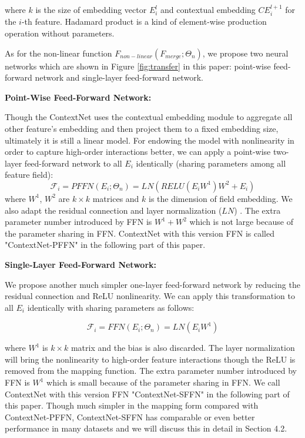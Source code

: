 \documentclass[sigconf]{acmart}
\begin{document}
\noindent where $k$ is the size of embedding vector $E_i^l$ and contextual embedding $CE_i^{l+1}$ for the $i$-th feature. Hadamard product is a kind of element-wise production operation without parameters.



As for the non-linear function $F_{non-linear}(F_{merge}; \Theta_n)$, we propose two neural networks which are shown in Figure \ref{fig:transfer} in this paper: point-wise feed-forward network and single-layer feed-forward network.


\noindent\textbf{Point-Wise Feed-Forward Network: }


Though the ContextNet uses the contextual embedding module to aggregate all other feature's embedding and then project them to a fixed embedding size, ultimately it is still a linear model. For endowing the model with nonlinearity in order to capture high-order interactions better, we can apply a point-wise two-layer feed-forward network to all $E_i$ identically (sharing parameters among all feature field):
\begin{equation}
  \mathcal{F}_i = PFFN(E_i; \Theta_n) = LN(RELU(E_iW^1)W^2 + E_i)
\end{equation}
where $W^1$, $W^2$ are $k \times k$ matrices and $k$ is the dimension of field embedding. We also adapt the residual connection and layer normalization ($LN$) \cite{ba2016layer}. The extra  parameter number  introduced by FFN is $W^1 + W^2$ which is not large because of the parameter sharing in FFN. ContextNet with this version FFN is called "ContextNet-PFFN" in the following part of this paper.




\noindent\textbf{Single-Layer Feed-Forward Network:}



We propose another much simpler one-layer feed-forward network by reducing the residual connection and ReLU nonlinearity. We can apply this transformation to all $E_i$ identically with sharing parameters as follows:

\begin{equation}
  \mathcal{F}_i = FFN(E_i; \Theta_n) = LN(E_iW^1)
\end{equation}


\noindent where $W^1$ is $k \times k$ matrix and the bias is also discarded. The layer normalization will bring the nonlinearity to high-order feature interactions though the ReLU is removed from the mapping function. The extra  parameter number introduced by FFN is $W^1$ which is small because of the parameter sharing in FFN. We call ContextNet with this version FFN "ContextNet-SFFN" in the following part of this paper. Though much simpler in the mapping form compared with ContextNet-PFFN,  ContextNet-SFFN has comparable or even better performance in many datasets and we will discuss this in detail in Section 4.2.
\end{document}
